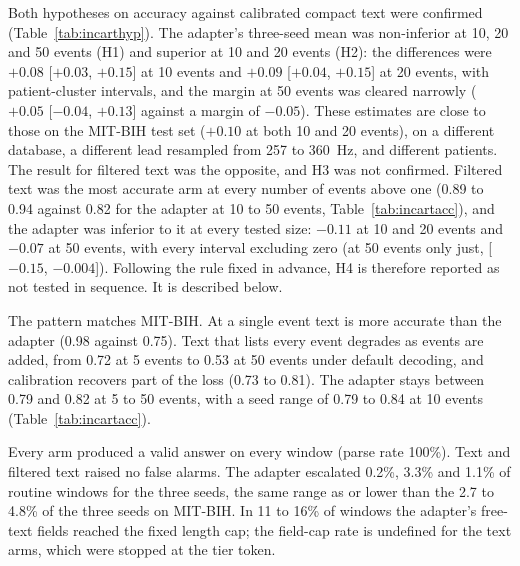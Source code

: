 Both hypotheses on accuracy against calibrated compact text were confirmed (Table~\ref{tab:incarthyp}). The adapter's three-seed mean was non-inferior at 10, 20 and 50 events (H1) and superior at 10 and 20 events (H2): the differences were $+0.08$ [$+0.03$, $+0.15$] at 10 events and $+0.09$ [$+0.04$, $+0.15$] at 20 events, with patient-cluster intervals, and the margin at 50 events was cleared narrowly ($+0.05$ [$-0.04$, $+0.13$] against a margin of $-0.05$). These estimates are close to those on the MIT-BIH test set ($+0.10$ at both 10 and 20 events), on a different database, a different lead resampled from 257 to 360~Hz, and different patients. The result for filtered text was the opposite, and H3 was not confirmed. Filtered text was the most accurate arm at every number of events above one (0.89 to 0.94 against 0.82 for the adapter at 10 to 50 events, Table~\ref{tab:incartacc}), and the adapter was inferior to it at every tested size: $-0.11$ at 10 and 20 events and $-0.07$ at 50 events, with every interval excluding zero (at 50 events only just, [$-0.15$, $-0.004$]). Following the rule fixed in advance, H4 is therefore reported as not tested in sequence. It is described below.

 The pattern matches MIT-BIH. At a single event text is more accurate than the adapter (0.98 against 0.75). Text that lists every event degrades as events are added, from 0.72 at 5 events to 0.53 at 50 events under default decoding, and calibration recovers part of the loss (0.73 to 0.81). The adapter stays between 0.79 and 0.82 at 5 to 50 events, with a seed range of 0.79 to 0.84 at 10 events (Table~\ref{tab:incartacc}).

 Every arm produced a valid answer on every window (parse rate 100\%). Text and filtered text raised no false alarms. The adapter escalated 0.2\%, 3.3\% and 1.1\% of routine windows for the three seeds, the same range as or lower than the 2.7 to 4.8\% of the three seeds on MIT-BIH. In 11 to 16\% of windows the adapter's free-text fields reached the fixed length cap; the field-cap rate is undefined for the text arms, which were stopped at the tier token.

